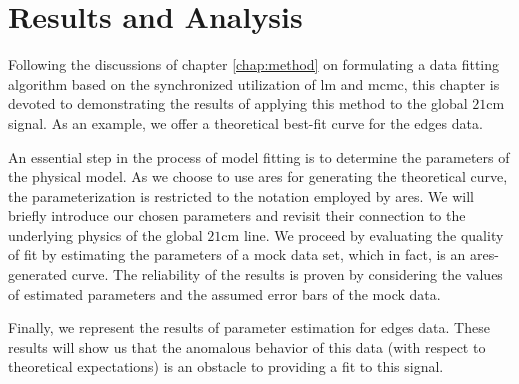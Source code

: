 \documentclass[12pt, TexShade, letterpaper]{report}
\begin{document}
\chapter{Results and Analysis}
\label{chap:results}
Following the discussions of chapter \ref{chap:method} on formulating a data fitting algorithm based on the synchronized utilization of \gls{lm} and \gls{mcmc}, this chapter is devoted to demonstrating the results of applying this method to the global $\mathrm{21cm}$ signal. As an example, we offer a theoretical best-fit curve for the \gls{edges} data. \par
An essential step in the process of model fitting is to determine the parameters of the physical model. As we choose to use \gls{ares} for generating the theoretical curve, the parameterization is restricted to the notation employed by \gls{ares}. We will briefly introduce our chosen parameters and revisit their connection to the underlying physics of the global $\mathrm{21cm}$ line. We proceed by evaluating the quality of fit by estimating the parameters of a mock data set, which in fact, is an \gls{ares}-generated curve. The reliability of the results is proven by considering the values of estimated parameters and the assumed error bars of the mock data. \par
Finally, we represent the results of parameter estimation for \gls{edges} data. These results will show us that the anomalous behavior of this data (with respect to theoretical expectations) is an obstacle to providing a fit to this signal.\par
\end{document}
